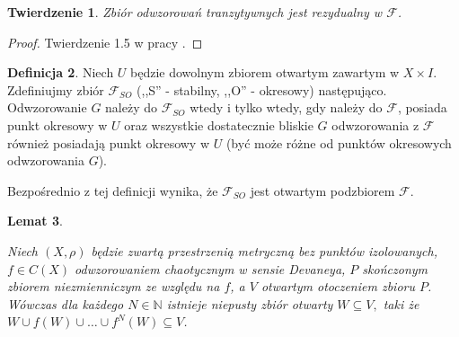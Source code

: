\documentclass[licencjacka]{pwr_wmat_praca_dyplomowa}
\theoremstyle{plain}
\newtheorem{theorem}{Twierdzenie}
\numberwithin{theorem}{chapter}
\newtheorem{lemma}[theorem]{Lemat}
\theoremstyle{definition}
\numberwithin{theorem}{chapter}
\newtheorem{definition}[theorem]{Definicja}
\begin{document}
\begin{theorem} \label{tranzytywne_rezydualne_w_F}
Zbiór odwzorowań tranzytywnych jest rezydualny w $\mathcal{F}$.
\end{theorem}

\begin{proof}
Twierdzenie 1.5 w pracy \cite{alseda1999entropy}.
\end{proof}



\begin{definition} \label{Fso_sa_otwartymi_podzbiorami_F}
Niech $U$ będzie dowolnym zbiorem otwartym zawartym w $X \times I$. Zdefiniujmy zbiór $\mathcal{F}_{SO}$ (,,S'' - stabilny, ,,O'' - okresowy) następująco. Odwzorowanie $G$ należy do $\mathcal{F}_{SO}$ wtedy i tylko wtedy, gdy należy do $\mathcal{F}$, posiada punkt okresowy w $U$ oraz wszystkie dostatecznie bliskie $G$ odwzorowania z $\mathcal{F}$ również posiadają punkt okresowy w $U$ (być może różne od punktów okresowych odwzorowania $G$).
\end{definition}
Bezpośrednio z tej definicji wynika, że $\mathcal{F}_{SO}$ jest otwartym podzbiorem $\mathcal{F}.$




\begin{lemma}
\label{w_otoczeniu_niezmienniczego_jest_otwarty_zawarty_w_iteracjach}

Niech $(X, \rho)$ będzie zwartą przestrzenią metryczną bez punktów izolowanych, $f \in C(X)$ odwzorowaniem chaotycznym w sensie Devaneya, $P$ skończonym zbiorem niezmienniczym ze względu na $f$, a $V$ otwartym otoczeniem zbioru $P$.
Wówczas dla każdego $N \in \mathbb{N}$ istnieje niepusty zbiór otwarty $W \subseteq V,$ taki że $W \cup f(W) \cup \ldots \cup f^N(W) \subseteq V$.
\end{lemma}
\end{document}
